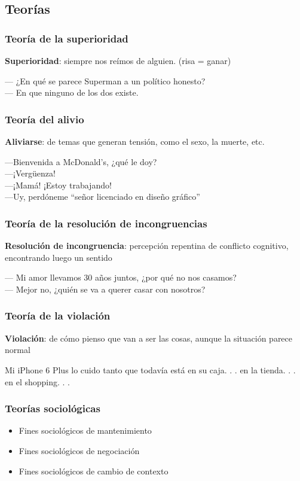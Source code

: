 \subsection{Teorías}
\begin{frame}
	\frametitle{Teoría de la superioridad}

	\textbf{Superioridad}: siempre nos reímos de alguien. (risa = ganar)
	\begin{example}
		— ¿En qué se parece Superman a un político honesto?\\
		— En que ninguno de los dos existe.
	\end{example}
\end{frame}

\begin{frame}
\frametitle{Teoría del alivio}
	\textbf{Aliviarse}: de temas que generan tensión, como el sexo, la muerte, etc.
	\begin{example}
		—Bienvenida a McDonald’s, ¿qué le doy?\\
		—¡Vergüenza!\\
		—¡Mamá! ¡Estoy trabajando!\\
		—Uy, perdóneme ``señor licenciado en diseño gráfico''\\
	\end{example}
\end{frame}

\begin{frame}
\frametitle{Teoría de la resolución de incongruencias}
	\textbf{Resolución de incongruencia}: percepción repentina de conflicto cognitivo, encontrando luego un sentido
	\begin{example}
		— Mi amor llevamos 30 años juntos, ¿por qué no nos casamos?\\
		— Mejor no, ¿quién se va a querer casar con nosotros?
	\end{example}
\end{frame}

\begin{frame}
\frametitle{Teoría de la violación}
	\textbf{Violación}: de cómo pienso que van a ser las cosas, aunque la situación parece normal
	\begin{example}
		Mi iPhone 6 Plus lo cuido tanto que todavía está en su caja. . . en la tienda. . . en el shopping. . .
	\end{example}
\end{frame}

\begin{frame}
\frametitle{Teorías sociológicas}
	\begin{itemize}
		\item Fines sociológicos de mantenimiento
		\item Fines sociológicos de negociación
		\item Fines sociológicos de cambio de contexto
	\end{itemize}
\end{frame}

